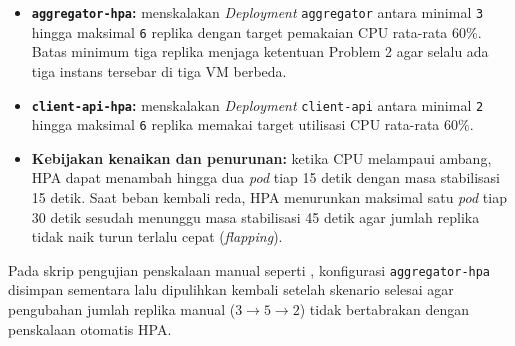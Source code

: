 \begin{itemize}
  \item \textbf{\texttt{aggregator-hpa}:} menskalakan \textit{Deployment} \texttt{aggregator} antara minimal \texttt{3} hingga maksimal \texttt{6} replika dengan target pemakaian CPU rata-rata $60\%$. Batas minimum tiga replika menjaga ketentuan Problem 2 agar selalu ada tiga instans tersebar di tiga VM berbeda.
  \item \textbf{\texttt{client-api-hpa}:} menskalakan \textit{Deployment} \texttt{client-api} antara minimal \texttt{2} hingga maksimal \texttt{6} replika memakai target utilisasi CPU rata-rata $60\%$.
  \item \textbf{Kebijakan kenaikan dan penurunan:} ketika CPU melampaui ambang, HPA dapat menambah hingga dua \textit{pod} tiap 15 detik dengan masa stabilisasi 15 detik. Saat beban kembali reda, HPA menurunkan maksimal satu \textit{pod} tiap 30 detik sesudah menunggu masa stabilisasi 45 detik agar jumlah replika tidak naik turun terlalu cepat (\textit{flapping}).
\end{itemize}

Pada skrip pengujian penskalaan manual seperti , konfigurasi \texttt{aggregator-hpa} disimpan sementara lalu dipulihkan kembali setelah skenario selesai agar pengubahan jumlah replika manual ($3 \to 5 \to 2$) tidak bertabrakan dengan penskalaan otomatis HPA.

